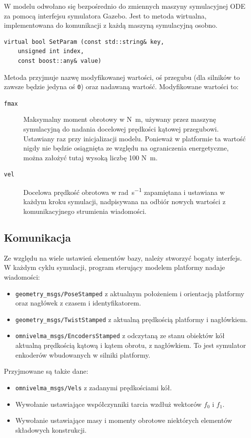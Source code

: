 		W modelu odwołano się bezpośrednio do zmiennych maszyny symulacyjnej ODE za pomocą interfejsu symulatora Gazebo.
		Jest to metoda wirtualna, implementowana do komunikacji z każdą maszyną symulacyjną osobno.
		\begin{verbatim}
virtual bool SetParam (const std::string& key,
	unsigned int index,
	const boost::any& value)
		\end{verbatim}
		Metoda przyjmuje nazwę modyfikowanej wartości, oś przegubu (dla silników to zawsze będzie jedyna oś \texttt{0}) oraz nadawaną wartość.
		Modyfikowane wartości to:
		\begin{description}
			\item[\texttt{fmax}] Maksymalny moment obrotowy w \si{\newton\metre}, używany przez maszynę symulacyjną do nadania docelowej prędkości kątowej przegubowi. Ustawiany raz przy inicjalizacji modelu. Ponieważ w platformie ta wartość nigdy nie będzie osiągnięta ze względu na ograniczenia energetyczne, można założyć tutaj wysoką liczbę 100 \si{\newton\metre}.
			\item[\texttt{vel}] Docelowa prędkość obrotowa w \si{\radian\per\second} zapamiętana i ustawiana w każdym kroku symulacji, nadpisywana na odbiór nowych wartości z komunikacyjnego strumienia wiadomości.
		\end{description}
	
	\subsection{Komunikacja}
		Ze względu na wiele ustawień elementów bazy, należy stworzyć bogaty interfejs.
		W każdym cyklu symulacji, program sterujący modelem platformy nadaje wiadomości:
		\begin{itemize}
		\item \texttt{geometry\_msgs/PoseStamped} z aktualnym położeniem i orientacją platformy oraz nagłówek z czasem i identyfikatorem.
		\item \texttt{geometry\_msgs/TwistStamped} z aktualną prędkością platformy i nagłówkiem.
		\item \texttt{omnivelma\_msgs/EncodersStamped} z odczytaną ze stanu obiektów kół aktualną prędkością kątową i kątem obrotu, z nagłówkiem. 
		To jest symulator enkoderów wbudowanych w silniki platformy.
		\end{itemize}
		
		Przyjmowane są także dane:
		\begin{itemize}
		\item \texttt{omnivelma\_msgs/Vels} z zadanymi prędkościami kół.
		\item Wywołanie ustawiające współczynniki tarcia wzdłuż wektorów $f_0$ i $f_1$.
		\item Wywołanie ustawiające masy i momenty obrotowe niektórych elementów składowych konstrukcji.
		\end{itemize}

